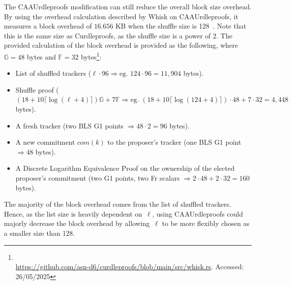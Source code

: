 The CAAUrdleproofs modification can still reduce the overall block size overhead.
By using the overhead calculation described by Whisk on CAAUrdleproofs, it measures a block overhead of $16.656$ KB when the shuffle size is 128~\cite{Whisk2024}.
Note that this is the same size as Curdleproofs, as the shuffle size is a power of 2.
The provided calculation of the block overhead is provided as the following, where $\mathbb{G}=48$ bytes and $\mathbb{F}=32$ bytes\footnote{\\ \href{https://github.com/asn-d6/curdleproofs/blob/main/src/whisk.rs}{https://github.com/asn-d6/curdleproofs/blob/main/src/whisk.rs}. Accessed: 26/05/2025}:
\begin{itemize}
    \item List of shuffled trackers ($\ell\cdot96\Rightarrow\text{eg. }124\cdot96=11,904$ bytes).
    \item Shuffle proof ($(18+10 \lceil\log(\ell+4)\rceil)\mathbb{G}+7\mathbb{F}\Rightarrow\text{eg. }(18+10\lceil\log(124+4)\rceil)\cdot48+7\cdot32=4,448$ bytes).
    \item A fresh tracker (two BLS G1 points $\Rightarrow48\cdot2=96$ bytes).
    \item A new commitment $com(k)$ to the proposer's tracker (one BLS G1 point $\Rightarrow48$ bytes).
    \item A Discrete Logarithm Equivalence Proof on the ownership of the elected proposer's commitment (two G1 points, two Fr scalars $\Rightarrow2\cdot48+2\cdot32=160$ bytes).
\end{itemize}
The majority of the block overhead comes from the list of shuffled trackers.
Hence, as the list size is heavily dependent on~$\ell$, using CAAUrdleproofs could majorly decrease the block overhead by allowing~$\ell$ to be more flexibly chosen as a smaller size than 128.